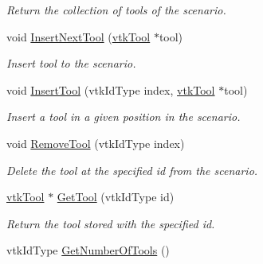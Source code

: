 \begin{DoxyCompactItemize}
\begin{DoxyCompactList}\small\item\em Return the collection of tools of the scenario. \item\end{DoxyCompactList}\item 
void \hyperlink{classvtkScenario_a5fd09f275e65e233038c0a6662bc2604}{InsertNextTool} (\hyperlink{classvtkTool}{vtkTool} $\ast$tool)
\begin{DoxyCompactList}\small\item\em Insert tool to the scenario. \item\end{DoxyCompactList}\item 
void \hyperlink{classvtkScenario_a4c250cc389a2da4caff6db86c12822e3}{InsertTool} (vtkIdType index, \hyperlink{classvtkTool}{vtkTool} $\ast$tool)
\begin{DoxyCompactList}\small\item\em Insert a tool in a given position in the scenario. \item\end{DoxyCompactList}\item 
void \hyperlink{classvtkScenario_a720fbda74cc08ba3fe2929945a07ba83}{RemoveTool} (vtkIdType index)
\begin{DoxyCompactList}\small\item\em Delete the tool at the specified id from the scenario. \item\end{DoxyCompactList}\item 
\hyperlink{classvtkTool}{vtkTool} $\ast$ \hyperlink{classvtkScenario_a16431d22983601557b1ea7fb3e62bc21}{GetTool} (vtkIdType id)
\begin{DoxyCompactList}\small\item\em Return the tool stored with the specified id. \item\end{DoxyCompactList}\item 
\hypertarget{classvtkScenario_a5c3795ce1928ab259dccd38720210c88}{
vtkIdType \hyperlink{classvtkScenario_a5c3795ce1928ab259dccd38720210c88}{GetNumberOfTools} ()}
\label{classvtkScenario_a5c3795ce1928ab259dccd38720210c88}


\end{DoxyCompactItemize}
